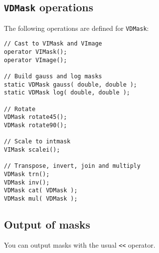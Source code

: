 \subsection{\texttt{VDMask} operations}

The following operations are defined for \verb+VDMask+:

\begin{verbatim}
// Cast to VIMask and VImage
operator VIMask();
operator VImage();

// Build gauss and log masks
static VDMask gauss( double, double );
static VDMask log( double, double );

// Rotate
VDMask rotate45();
VDMask rotate90(); 

// Scale to intmask
VIMask scalei();

// Transpose, invert, join and multiply
VDMask trn();
VDMask inv();
VDMask cat( VDMask );
VDMask mul( VDMask );
\end{verbatim}

\subsection{Output of masks}

You can output masks with the usual \verb+<<+ operator.
